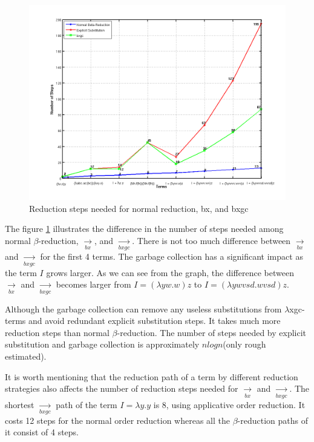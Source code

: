 \begin{figure}[h!]
\includegraphics[width=\textwidth]{pics/zhang_02}
\caption{Reduction steps needed for normal reduction, bx, and bxgc}
\label{fig:betaxgc}
\end{figure}


The figure \ref{fig:betaxgc} illustrates the difference in the number of steps needed among normal $\beta$-reduction, $\xrightarrow[bx]{}$, and $\xrightarrow[bxgc]{}$. There is not too much difference between $\xrightarrow[bx]{}$ and $\xrightarrow[bxgc]{}$ for the first 4 terms. The garbage collection has a significant impact as the term $I$ grows larger. As we can see from the graph, the difference between $\xrightarrow[bx]{}$ and $\xrightarrow[bxgc]{}$ becomes larger from $I = (\lambda yw.w)z$ to $I = (\lambda ywvsd.wvsd)z$.

Although the garbage collection can remove any useless substitutions from $\lambda$xgc-terms and avoid redundant explicit substitution steps. It takes much more reduction steps than normal $\beta$-reduction. The number of steps needed by explicit substitution and garbage collection is approximately $nlogn$(only rough estimated).

It is worth mentioning that the reduction path of a term by different reduction strategies also affects the number of reduction steps needed for $\xrightarrow[bx]{}$ and $\xrightarrow[bxgc]{}$. The shortest $\xrightarrow[bxgc]{}$ path of the term $I = \lambda y.y$ is 8, using applicative order reduction. It costs 12 steps for the normal order reduction whereas all the $\beta$-reduction paths of it consist of 4 steps.  



